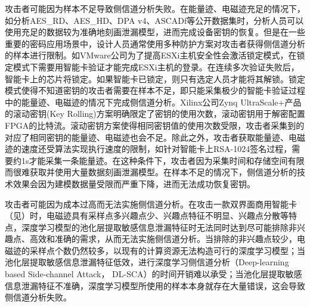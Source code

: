 {	攻击者可能因为样本不足导致侧信道分析失败。在能量迹、电磁迹充足的情况下，如分析AES\_RD\citep{AESRD}、AES\_HD\citep{AESHD}、DPA v4\citep{dpav4}、ASCADf\citep{ASCAD}等公开数据集时，分析人员可以使用充足的数据较为准确地刻画泄漏模型，进而完成设备密钥的恢复。但是在一些重要的密码应用场景中，设计人员通常使用多种防护方案对攻击者获得侧信道分析的样本进行限制。如VMware公司为了提高ESXi主机安全性会激活锁定模式，在锁定模式下需要用智能卡验证才能完成ESXi主机的登录。在连续多次验证失败后，智能卡上的芯片将锁定。如果智能卡已锁定，则只有选定人员才能将其解锁\citep{GUID-04636353-4A11-4874-9D59-7F4F4E5CF1F}。锁定模式使得不知道密钥的攻击者需要在样本不足，即只能采集极少的智能卡验证过程中的能量迹、电磁迹的情况下完成侧信道分析。Xilinx公司Zynq UltraScale+产品的滚动密钥(Key Rolling)方案明确限定了密钥的使用次数\citep{UG1085}，滚动密钥用于解密配置FPGA的比特流。滚动密钥方案使得相同密钥值的使用次数受限，攻击者采集到的对应了相同密钥的能量迹、电磁迹也会不足。除此之外，攻击者获取能量迹、电磁迹的速度还受算法实现执行速度的限制，如针对智能卡上RSA-1024签名过程，需要约1s才能采集一条能量迹。在这种条件下，攻击者因为采集时间和存储空间有限而很难获取并使用大量数据刻画泄漏模型。在样本不足的情况下，侧信道分析的技术效果会因为建模数据量受限而严重下降，进而无法成功恢复密钥。%
	
	攻击者可能因为成本过高而无法实施侧信道分析。在攻击一款双界面商用智能卡（见）时，电磁迹具有采样点多兴趣点少、兴趣点特征不明显、兴趣点分散等特点，深度学习模型的池化层提取敏感信息泄漏特征时无法同时达到尽可能排除非兴趣点、高效和准确的需求，从而无法实施侧信道分析。当排除的非兴趣点较少，电磁迹的采样点个数仍然较多，以现有的计算资源无法构造可行的深度学习模型；当池化层提取敏感信息泄漏特征低效，进行深度学习侧信道分析（Deep-learning based Side-channel Attack， DL-SCA）的时间开销难以承受；当池化层提取敏感信息泄漏特征不准确，深度学习模型所使用的样本本身就存在大量错误，这会导致侧信道分析失败。
	
}
